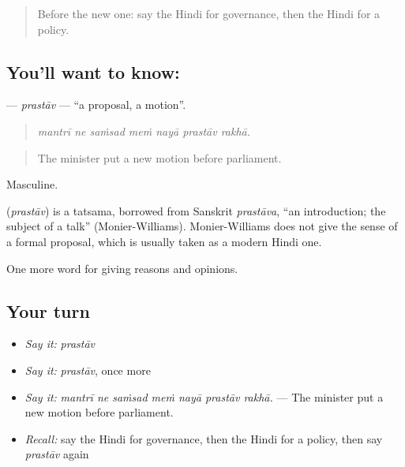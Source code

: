 \label{lesson:HI-C353-prastav}



\begin{quote}
Before the new one: say the Hindi for governance, then the Hindi for a policy.
\end{quote}

\subsection*{You'll want to know: }
\textbf{} — \emph{prastāv} — \textquotedblleft{}a proposal, a motion\textquotedblright{}.

\begin{quote}
      
\end{quote}

\begin{quote}
\emph{mantrī ne saṁsad meṁ nayā prastāv rakhā.}
\end{quote}

\begin{quote}
The minister put a new motion before parliament.
\end{quote}

Masculine.

\begin{cousinweb}
\textbf{} (\emph{prastāv}) is a tatsama, borrowed from Sanskrit \emph{prastāva}, \textquotedblleft{}an introduction; the subject of a talk\textquotedblright{} (Monier-Williams). Monier-Williams does not give the sense of a formal proposal, which is usually taken as a modern Hindi one.
\end{cousinweb}

\begin{grammarlens}[title={What you've built}]
One more word for giving reasons and opinions.
\end{grammarlens}

\subsection*{Your turn}
\begin{itemize}
\raggedright
  \item \emph{Say it:} \emph{prastāv}
  \item \emph{Say it:} \emph{prastāv}, once more
  \item \emph{Say it:} \emph{mantrī ne saṁsad meṁ nayā prastāv rakhā.} — The minister put a new motion before parliament.
  \item \emph{Recall:} say the Hindi for governance, then the Hindi for a policy, then say \emph{prastāv} again
\end{itemize}

